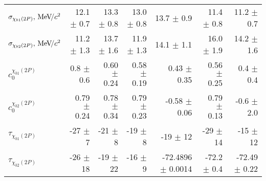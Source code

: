\begin{table}[H]
{{\begin{tabular}{lrrrrrr}
\rule{0pt}{4ex}$\sigma_{\chi_{b1}(2P)}, {\mathrm{\,Me\kern -0.1em V\!/}c^2}$ & 12.1 $\pm$ 0.7 & 13.3 $\pm$ 0.8 & 13.0 $\pm$ 0.8 & 13.7 $\pm$ 0.9 & 11.4 $\pm$ 0.8 & 11.2 $\pm$ 0.7\\
$\sigma_{\chi_{b2}(2P)}, {\mathrm{\,Me\kern -0.1em V\!/}c^2}$ & 11.2 $\pm$ 1.3 & 13.7 $\pm$ 1.6 & 11.9 $\pm$ 1.3 & 14.1 $\pm$ 1.1 & 16.0 $\pm$ 1.9 & 14.2 $\pm$ 1.6\\

\rule{0pt}{4ex}$c_0^{\chi_{b1}(2P)}$ & 0.8 $\pm$ 0.6 & 0.60 $\pm$ 0.24 & 0.58 $\pm$ 0.19 & 0.43 $\pm$ 0.35 & 0.56 $\pm$ 0.25 & 0.4 $\pm$ 0.4\\
$c_0^{\chi_{b2}(2P)}$ & 0.79 $\pm$ 0.24 & 0.78 $\pm$ 0.34 & 0.79 $\pm$ 0.23 & -0.58 $\pm$ 0.06 & 0.79 $\pm$ 0.13 & -0.6 $\pm$ 2.0\\

\rule{0pt}{4ex}$\tau_{\chi_{b1}(2P)}$ & -27 $\pm$ 7 & -21 $\pm$ 8 & -19 $\pm$ 8 & -19 $\pm$ 12 & -29 $\pm$ 14 & -15 $\pm$ 12\\
$\tau_{\chi_{b2}(2P)}$ & -26 $\pm$ 18 & -19 $\pm$ 22 & -16 $\pm$ 9 & -72.4896 $\pm$ 0.0014 & -72.2 $\pm$ 0.4 & -72.49 $\pm$ 0.22\\
\bottomrule
\end{tabular}
} %

} %
\label{tab:mc:chib2p_ups2s:fits}
\end{table}

